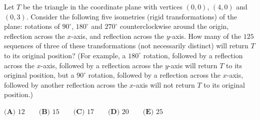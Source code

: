 Let $T$ be the triangle in the coordinate plane with vertices $(0,0)$, $(4,0)$ and $(0,3)$. Consider the following five isometries (rigid transformations) of the plane: rotations of $90^\circ$, $180^\circ$ and $270^\circ$ counterclockwise around the origin, reflection across the $x$-axis, and reflection across the $y$-axis. How many of the $125$ sequences of three of these transformations (not necessarily distinct) will return $T$ to its original position? (For example, a $180^\circ$ rotation, followed by a reflection across the $x$-axis, followed by a reflection across the $y$-axis will return $T$ to its original position, but a $90^\circ$ rotation, followed by a reflection across the $x$-axis, followed by another reflection across the $x$-axis will not return $T$ to its original position.)

$\textbf{(A) }12\qquad\textbf{(B) }15\qquad\textbf{(C) }17\qquad\textbf{(D) }20\qquad\textbf{(E) }25$
